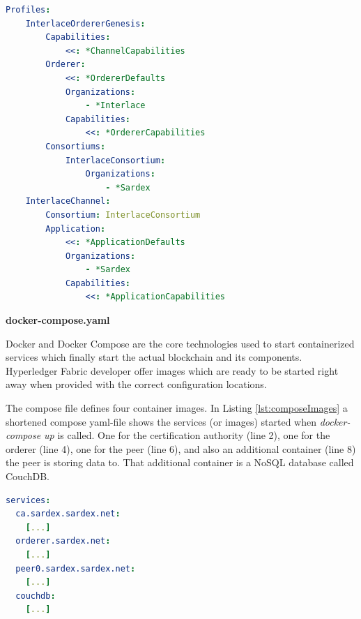 \begin{center}
\begin{minipage}{0.8\textwidth}
\small
\begin{lstlisting}[language=yaml,firstnumber=1,caption={\bf\small configtx.yaml excerpt -- Profiles definition}, captionpos=b,label=lst:configTxProfiles]
Profiles:
    InterlaceOrdererGenesis:
        Capabilities:
            <<: *ChannelCapabilities
        Orderer:
            <<: *OrdererDefaults
            Organizations:
                - *Interlace
            Capabilities:
                <<: *OrdererCapabilities
        Consortiums:
            InterlaceConsortium:
                Organizations:
                    - *Sardex
    InterlaceChannel:
        Consortium: InterlaceConsortium
        Application:
            <<: *ApplicationDefaults
            Organizations:
                - *Sardex
            Capabilities:
                <<: *ApplicationCapabilities
\end{lstlisting}
\end{minipage}
\end{center}

\textbf{docker-compose.yaml}

Docker and Docker Compose are the core technologies used to start containerized services which finally start the actual blockchain and its components. Hyperledger Fabric developer offer images which are ready to be started right away when provided with the correct configuration locations.

The compose file defines four container images. In Listing \ref{lst:composeImages} a shortened compose yaml-file shows the services (or images) started when \textit{docker-compose up} is called. One for the certification authority (line 2), one for the orderer (line 4), one for the peer (line 6), and also an additional container (line 8) the peer is storing data to. That additional container is a NoSQL database called CouchDB. 

\begin{center}
\begin{minipage}{0.8\textwidth}
\small
\begin{lstlisting}[language=yaml,firstnumber=1,caption={\bf\small docker-compose.yaml excerpt}, captionpos=b,label=lst:composeImages]
services:
  ca.sardex.sardex.net:
    [...]
  orderer.sardex.net:
    [...]
  peer0.sardex.sardex.net:
    [...]
  couchdb:
    [...]
\end{lstlisting}
\end{minipage}
\end{center}

